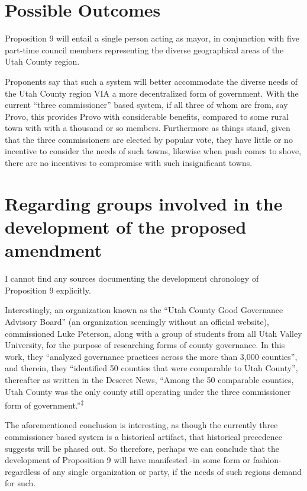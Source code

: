\section{Possible Outcomes}

Proposition 9 will entail a single person acting as mayor, in conjunction with five part-time council members representing the diverse geographical areas of the Utah County region. 

Proponents say that such a system will better accommodate the diverse needs of the Utah County region VIA a more decentralized form of government. With the current “three commissioner” based system, if all three of whom are from, say Provo, this provides Provo with considerable benefits, compared to some rural town with with a thousand or so members. Furthermore as things stand, given that the three commissioners are elected by popular vote, they have little or no incentive to consider the needs of such towns, likewise when push comes to shove, there are no incentives to compromise with such insignificant towns. 


\section{Regarding groups involved in the development of the proposed amendment}

I cannot find any sources documenting the development chronology of Proposition 9 explicitly.


Interestingly, an organization known as the ``Utah County Good Governance Advisory Board'' (an organization seemingly without an official website), commissioned Luke Peterson, along with a group of students from all Utah Valley University, for the purpose of researching forms of county governance. In this work, they ``analyzed governance practices across the more than 3,000 counties'', and therein, they ``identified 50 counties that were comparable to Utah County'', thereafter as written in the Deseret News, ``Among the 50 comparable counties, Utah County was the only county still operating under the three commissioner form of government.''\textsuperscript{‡}

The aforementioned conclusion is interesting, as though the currently three commissioner based system is a historical artifact, that historical precedence suggests will be phased out. So therefore, perhaps we can conclude that the development of Proposition 9 will have manifested -in some form or fashion- regardless of any single organization or party, if the needs of such regions demand for such.

